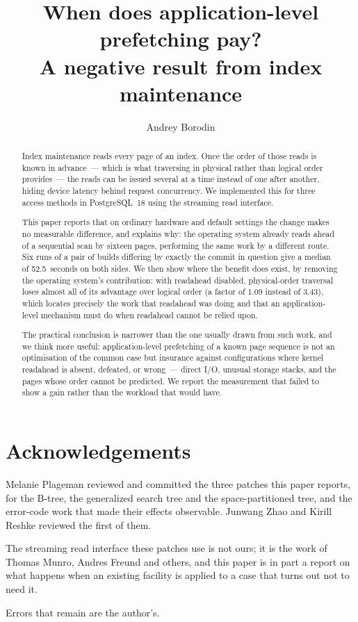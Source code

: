 \documentclass[11pt, a4paper]{article}
\title{When does application-level prefetching pay?\\
A negative result from index maintenance}
\author{Andrey Borodin}
\date{}
\begin{document}
\maketitle

\begin{abstract}
Index maintenance reads every page of an index. Once the order of those reads is
known in advance~--- which is what traversing in physical rather than logical
order provides~--- the reads can be issued several at a time instead of one after
another, hiding device latency behind request concurrency. We implemented this
for three access methods in PostgreSQL~18 using the streaming read interface.

This paper reports that on ordinary hardware and default settings the change
makes no measurable difference, and explains why: the operating system already
reads ahead of a sequential scan by sixteen pages, performing the same work by a
different route. Six runs of a pair of builds differing by exactly the commit in
question give a median of 52.5~seconds on both sides. We then show where the
benefit does exist, by removing the operating system's contribution: with
readahead disabled, physical-order traversal loses almost all of its advantage
over logical order (a factor of 1.09 instead of 3.43), which locates precisely
the work that readahead was doing and that an application-level mechanism must
do when readahead cannot be relied upon.

The practical conclusion is narrower than the one usually drawn from such work,
and we think more useful: application-level prefetching of a known page sequence
is not an optimisation of the common case but insurance against configurations
where kernel readahead is absent, defeated, or wrong~--- direct I/O, unusual
storage stacks, and the pages whose order cannot be predicted. We report the
measurement that failed to show a gain rather than the workload that would have.
\end{abstract}



\section*{Acknowledgements}


Melanie Plageman reviewed and committed the three patches this paper reports,
for the B-tree, the generalized search tree and the space-partitioned tree, and
the error-code work that made their effects observable. Junwang Zhao and Kirill
Reshke reviewed the first of them.

The streaming read interface these patches use is not ours; it is the work of
Thomas Munro, Andres Freund and others, and this paper is in part a report on
what happens when an existing facility is applied to a case that turns out not to
need it.

Errors that remain are the author's.



\end{document}
